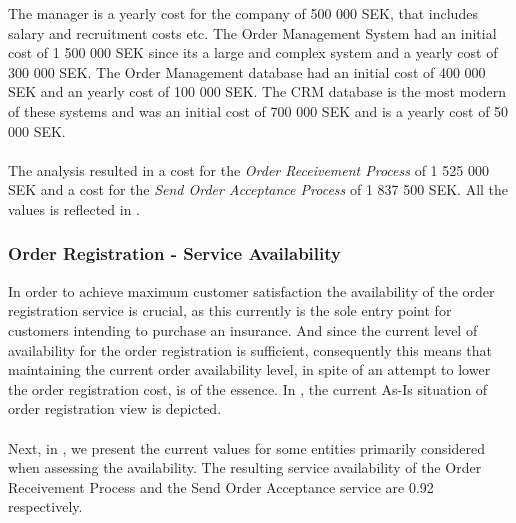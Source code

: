 The manager is a yearly cost for the company of 500 000 SEK, that includes salary and recruitment costs etc. The Order Management System had an initial cost of 1 500 000 SEK since its a large and complex system and a yearly cost of 300 000 SEK. The Order Management database had an initial cost of 400 000 SEK and an yearly cost of 100 000 SEK. The CRM database is the most modern of these systems and was an initial cost of 700 000 SEK and is a yearly cost of 50 000 SEK. \\\\
%
The analysis resulted in a cost for the \textsl{Order Receivement Process} of 1 525 000 SEK and a cost for the \textsl{Send Order Acceptance Process} of 1 837 500 SEK. All the values is reflected in .
%

%
\subsubsection{Order Registration - Service Availability}
\label{sec:order_availability}
In order to achieve maximum customer satisfaction the availability of the order registration service is crucial, as this currently is the sole entry point for customers intending to purchase an insurance. And since the current level of availability for the order registration is sufficient, consequently this means that maintaining the current order availability level, in spite of an attempt to lower the order registration cost, is of the essence. In , the current As-Is situation of order registration view is depicted. \\\\
%
Next, in , we present the current values for some entities primarily considered when assessing the availability. The resulting service availability of the Order Receivement Process and the Send Order Acceptance service are 0.92 respectively.


